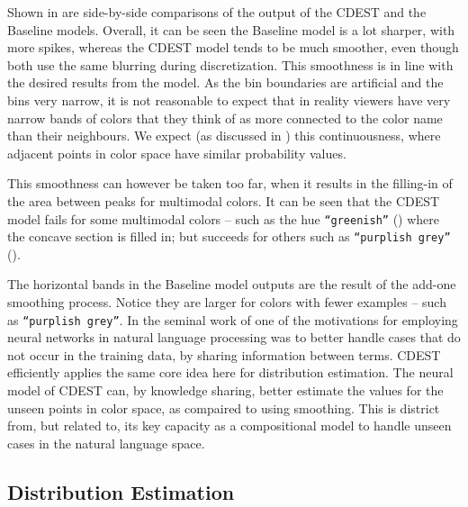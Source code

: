 \documentclass[11pt,a4paper]{article}
\newcommand{\textcite}{\cite}
\begin{document}


Shown in  are side-by-side comparisons of the output of the CDEST and the Baseline models.
Overall, it can be seen the Baseline model is a lot sharper, with more spikes,
whereas the CDEST model tends to be much smoother, even though both use the same blurring during discretization.
This smoothness is in line with the desired results from the model.
As the bin boundaries are artificial and the bins very narrow, it is not reasonable to expect that in reality viewers have very narrow bands of colors that they think of as more connected to the color name than their neighbours.
We expect  (as discussed in ) this continuousness, where adjacent points in color space have similar probability values.

This smoothness can however be taken too far, when it results in the filling-in of the area between peaks for multimodal colors.
It can be seen that the CDEST model fails for some multimodal colors -- such as the hue \texttt{``greenish''} () where the concave section is filled in;
but succeeds for others such as \texttt{``purplish grey''} ().


The horizontal bands in the Baseline model outputs are the result of the add-one smoothing process.
Notice they are larger for colors with fewer examples -- such as \texttt{``purplish grey''}.
In the seminal work of \textcite{NPLM} one of the motivations for employing neural networks in natural language processing was to better handle cases that do not occur in the training data, by sharing information between terms.
CDEST efficiently applies the same core idea here for distribution estimation.
The neural model of CDEST can, by knowledge sharing, better estimate the values for the unseen points in color space, as compaired to using smoothing.
This is district from, but related to, its key capacity as a compositional model to handle unseen cases in the natural language space. 


\subsection{Distribution Estimation}
\end{document}
